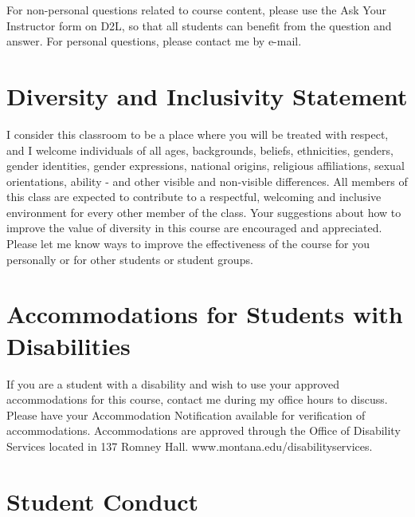 \documentclass[letterpaper]{inzane_syllabus} %
\begin{document}
For non-personal questions related to course content, please use the Ask Your Instructor form on D2L, so that all students can benefit from the question and answer.   For personal questions, please contact me by e-mail.


\vspace{0.5cm}
\section{Diversity and Inclusivity Statement}

I consider this classroom to be a place where you will be treated with respect, and I welcome individuals of all ages, backgrounds, beliefs, ethnicities, genders, gender identities, gender expressions, national origins, religious affiliations, sexual orientations, ability - and other visible and non-visible differences. All members of this class are expected to contribute to a respectful, welcoming and inclusive environment for every other member of the class.  Your suggestions about how to improve the value of diversity in this course are encouraged and appreciated. Please let me know ways to improve the effectiveness of the course for you personally or for other students or student groups.
 
\vspace{0.5cm}
\section{Accommodations for Students with Disabilities}

If you are a student with a disability and wish to use your approved accommodations for this course, contact me during my office hours to discuss. Please have your Accommodation Notification available for verification of accommodations. Accommodations are approved through the Office of Disability Services located in 137 Romney Hall.  www.montana.edu/disabilityservices.

\vspace{0.5cm}
\section{Student Conduct}
\end{document}
